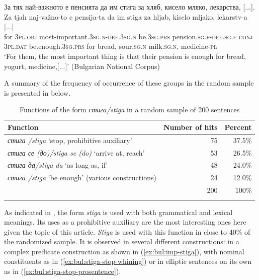 \documentclass[output=paper,colorlinks=true, citecolor=brown]{langscibook}
\begin{document}
    \ex За тях най-важното е пенсията да им стига за хляб, кисело мляко, лекарства, [...]. \label{ex:bul:stiga-enough}\\
        \gll Za tjah naj-važno-to e pensija-ta da im stiga za hljab, kiselo mljako, lekarstv-a [...]\\
            for \textsc{3pl.obj} most-important.\textsc{3sg.n}-\textsc{def.3sg.n} be.\textsc{3sg.prs} pension.\textsc{sg.f}-\textsc{def.sg.f} \textsc{conj} \textsc{3pl.dat} be.enough.\textsc{3sg.prs} for bread, sour.\textsc{sg.n} milk.\textsc{sg.n}, medicine-\textsc{pl}\\
        \glt `For them, the most important thing is that their pension is enough for bread, yogurt, medicine,[...]' (Bulgarian National Corpus)
    \z 
\z 

A summary of the frequency of occurrence of these groups in the random sample is presented in  below.


\begin{table}
    \begin{tabular}{lrr}
        \lsptoprule
        \textbf{Function} & \textbf{Number of hits}& \textbf{Percent}\\
        \midrule
        \textit{стига \slash stiga} `stop, prohibitive auxiliary'  & 75 & 37.5\%\\
        \textit{стига се (до)\slash stiga se (do)} `arrive at, reach'  & 53 & 26.5\%\\
        \textit{стига да\slash stiga da} `as long as, if' & 48 & 24.0\%\\
        \textit{стига \slash stiga}  `be enough' (various constructions) & 24 & 12.0\%\\
        \midrule
         & 200 & 100\%\\
        \lspbottomrule
    \end{tabular}
    \caption{Functions of the form \textit{стига\slash stiga} in a random sample of 200 sentences}
    \label{tab:bul:stiga} 
\end{table}

As indicated in , the form \textit{stiga} is used with both grammatical and lexical meanings. Its uses as a prohibitive auxiliary are the most interesting ones here given the topic of this article. \textit{Stiga} is used with this function in close to 40\% of the randomized sample. It is observed in several different constructions: in a complex predicate construction as shown in (\ref{ex:bul:imp-stiga}), with nominal constituents as in (\ref{ex:bul:stiga-stop-whining}) or in elliptic sentences on its own as in (\ref{ex:bul:stiga-stop-prosentence}).
\end{document}

